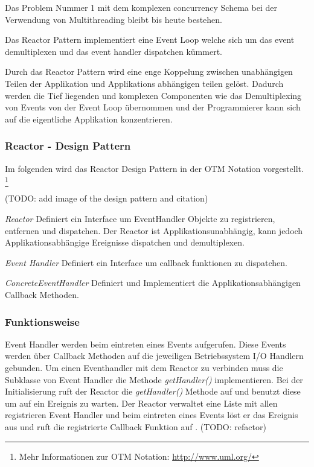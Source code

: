 Das Problem Nummer 1 mit dem komplexen concurrency Schema bei der Verwendung von Multithreading bleibt bis heute bestehen.

Das Reactor Pattern implementiert eine Event Loop welche sich um das event demultiplexen und das event handler dispatchen kümmert.

Durch das Reactor Pattern wird eine enge Koppelung zwischen unabhängigen Teilen der Applikation und Applikations abhängigen teilen gelöst. Dadurch werden die Tief liegenden und komplexen Componenten wie das Demultiplexing von Events von der Event Loop übernommen und der Programmierer kann sich auf die eigentliche Applikation konzentrieren. \cite[p. 2]{Sch95}


\subsubsection{Reactor - Design Pattern}

Im folgenden wird das Reactor Design Pattern in der OTM Notation vorgestellt. \footnote[0]{Mehr Informationen zur OTM Notation: \url{http://www.uml.org/}}

(TODO: add image of the design pattern and citation)

\cite[p. 2]{Sch95}

\emph{Reactor}
	Definiert ein Interface um EventHandler Objekte zu registrieren, entfernen und dispatchen. Der Reactor ist Applikationsunabhängig, kann jedoch Applikationsabhängige Ereignisse dispatchen und demultiplexen.

\emph{Event Handler}
	Definiert ein Interface um callback funktionen zu dispatchen.

\emph{ConcreteEventHandler}
	Definiert und Implementiert die Applikationsabhängigen Callback Methoden.

\subsubsection{Funktionsweise}
Event Handler werden beim eintreten eines Events aufgerufen. Diese Events werden über Callback Methoden auf die jeweiligen Betriebssystem I/O Handlern gebunden. Um einen Eventhandler mit dem Reactor zu verbinden muss die Subklasse von Event Handler die Methode \emph{getHandler()} implementieren. Bei der Initialisierung ruft der Reactor die \emph{getHandler()} Methode auf und benutzt diese um auf ein Ereignis zu warten. Der Reactor verwaltet eine Liste mit allen registrieren Event Handler und beim eintreten eines Events löst er das Ereignis aus und ruft die registrierte Callback Funktion auf \cite[p. 5]{Sch95}. (TODO: refactor)

